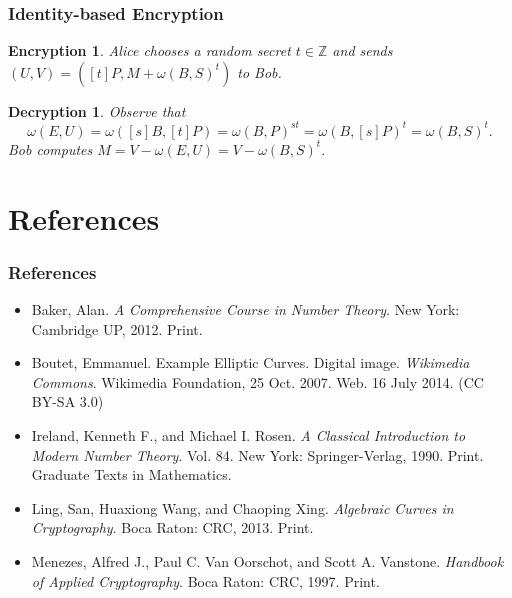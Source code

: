 \documentclass{beamer}
\newtheorem{encryption}{Encryption}
\newtheorem{decryption}{Decryption}
\begin{document}
    \begin{frame}
        \frametitle{Identity-based Encryption}
        \begin{encryption}
            Alice chooses a random secret \(t \in \mathbb{Z}\) and sends
            \((U, V) = ([t]P, M + \omega(B, S)^t)\) to Bob.
        \end{encryption}
        \vfill
        \begin{decryption}
            Observe that \[\omega(E, U) = \omega([s]B, [t]P) =
            \omega(B, P)^{st} = \omega(B, [s]P)^t = \omega(B, S)^t.\]
            Bob computes \(M = V - \omega(E, U) = V - \omega(B, S)^t\).
        \end{decryption}
    \end{frame}

    \section{References}
    \begin{frame} %
        \frametitle{References}
        \begin{itemize}
            \item Baker, Alan. \emph{A Comprehensive Course in Number Theory}.
                New York: Cambridge UP, 2012. Print.
            \item Boutet, Emmanuel. Example Elliptic Curves. Digital image.
                \emph{Wikimedia Commons}.
                Wikimedia Foundation, 25 Oct. 2007.
                Web. 16 July 2014. (CC BY-SA 3.0)
            \item Ireland, Kenneth F., and Michael I. Rosen. \emph{A Classical
                Introduction to Modern Number Theory}. Vol. 84. New York:
                Springer-Verlag, 1990. Print. Graduate Texts in Mathematics.
            \item Ling, San, Huaxiong Wang, and Chaoping Xing. \emph{Algebraic
                Curves in Cryptography}. Boca Raton: CRC, 2013. Print.
            \item Menezes, Alfred J., Paul C. Van Oorschot, and
                Scott A. Vanstone. \emph{Handbook of Applied Cryptography}.
                Boca Raton: CRC, 1997. Print.
        \end{itemize}
    \end{frame}
\end{document}
